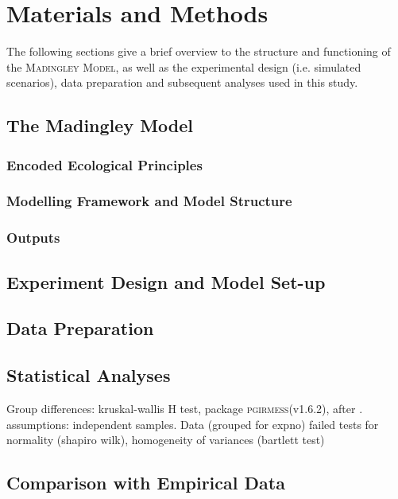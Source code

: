 \chapter{Materials and Methods}
\label{chap:mat}
The following sections give a brief overview to the    structure and functioning of the \textsc{Madingley Model}, as well as the experimental design (i.e. simulated scenarios), data preparation and subsequent analyses used in this study.
\section{The Madingley Model}
\label{chap:mat:madingley}

\subsection{Encoded Ecological Principles}
\label{chap:mat:madingley:princip}

\subsection{Modelling Framework and Model Structure}
\label{chap:mat:madingley:structure}

\subsection{Outputs}
\label{chap:mat:madingley:output}

\section{Experiment Design and Model Set-up}
\label{chap:mat:exp}

\section{Data Preparation}
\label{chap:mat:data}

\section{Statistical Analyses}
\label{chap:mat:stats}

Group differences: kruskal-wallis H test, package \textsc{pgirmess}(v1.6.2), after \cite{Siegel1988}. assumptions: independent samples. Data (grouped for expno) failed tests for normality (shapiro wilk), homogeneity of variances (bartlett test)

\section{Comparison with Empirical Data}
\label{chap:mat:emp}

